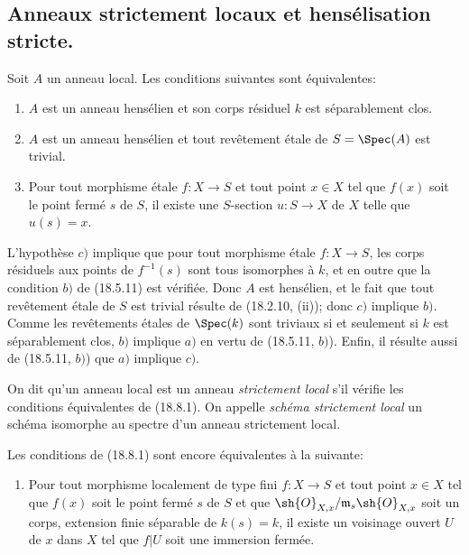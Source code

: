 \subsection{Anneaux strictement locaux et hensélisation stricte.}

\begin{proposition}[18.8.1]
\label{IV.18.8.1}
Soit $A$ un anneau local. Les conditions suivantes sont équivalentes:
\begin{enumerate}
  \item[$a)$] $A$ est un anneau hensélien et son corps résiduel $k$ est séparablement clos.
  \item[$b)$] $A$ est un anneau hensélien et tout revêtement étale de $S=\Spec(A)$ est trivial.
  \item[$c)$] Pour tout morphisme étale $f:X\to S$ et tout point $x\in X$ tel que $f(x)$ soit le point fermé $s$ de $S$, il existe une $S$-section $u:S\to X$ de $X$ telle que $u(s)=x$.
\end{enumerate}
\end{proposition}

L'hypothèse $c)$ implique que pour tout morphisme étale $f:X\to S$, les corps résiduels aux points de $f^{-1}(s)$ sont tous isomorphes à $k$, et en outre que la condition $b)$ de (18.5.11) est vérifiée. Donc $A$ est hensélien, et le fait que tout revêtement étale de $S$ est trivial résulte de (18.2.10, (ii)); donc $c)$ implique $b)$. Comme les revêtements étales de $\Spec(k)$ sont triviaux si et seulement si $k$ est séparablement clos, $b)$ implique $a)$ en vertu de (18.5.11, $b)$). Enfin, il résulte aussi de (18.5.11, $b)$) que $a)$ implique $c)$.

\begin{definition}[18.8.2]
On dit qu'un anneau local est un anneau \emph{strictement local} s'il vérifie les conditions équivalentes de (18.8.1). On appelle \emph{schéma strictement local} un schéma isomorphe au spectre d'un anneau strictement local.
\end{definition}

\begin{remark}[18.8.3]
\label{IV.18.8.3}
Les conditions de (18.8.1) sont encore équivalentes à la suivante:
\begin{enumerate}
  \item[$d)$] Pour tout morphisme localement de type fini $f:X\to S$ et tout point $x\in X$ tel que $f(x)$ soit le point fermé $s$ de $S$ et que $\sh{O}_{X,x}/\mathfrak m_s\sh{O}_{X,x}$ soit un corps, extension finie séparable de $k(s)=k$, il existe un voisinage ouvert $U$ de $x$ dans $X$ tel que $f|U$ soit une immersion fermée.
\end{enumerate}
\end{remark}

